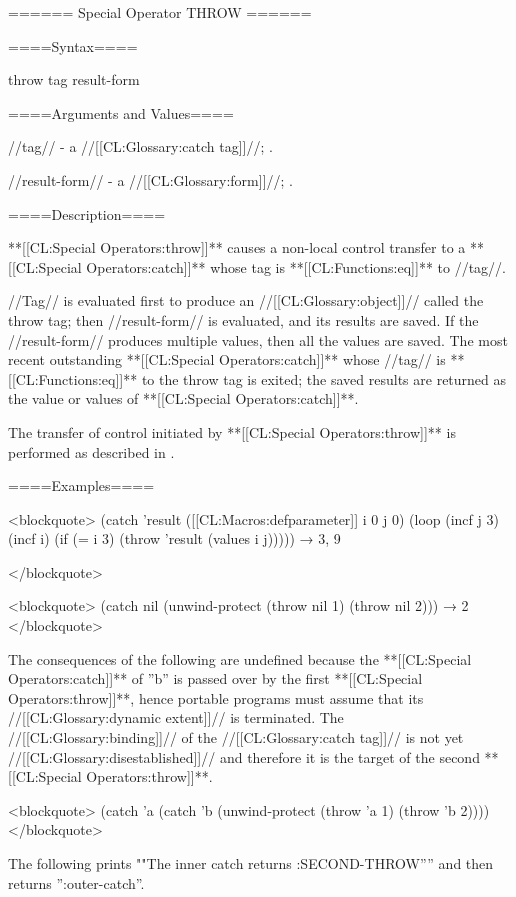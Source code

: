 ====== Special Operator THROW ======

====Syntax====

\DefspecNoReturn throw {tag result-form}

====Arguments and Values====

//tag// - a //[[CL:Glossary:catch tag]]//; \eval.

//result-form// - a //[[CL:Glossary:form]]//; \evalspecial.

====Description====

**[[CL:Special Operators:throw]]** causes a non-local control transfer to a **[[CL:Special Operators:catch]]** whose tag is **[[CL:Functions:eq]]** to //tag//.

//Tag// is evaluated first to produce an //[[CL:Glossary:object]]// called the throw tag; then //result-form// is evaluated, and its results are saved. If the //result-form// produces multiple values, then all the values are saved. The most recent outstanding **[[CL:Special Operators:catch]]** whose //tag// is **[[CL:Functions:eq]]** to the throw tag is exited; the saved results are returned as the value or values of **[[CL:Special Operators:catch]]**.

The transfer of control initiated by **[[CL:Special Operators:throw]]** is performed as described in \secref\TransferOfControl.

====Examples====

<blockquote> (catch 'result ([[CL:Macros:defparameter]] i 0 j 0) (loop (incf j 3) (incf i) (if (= i 3) (throw 'result (values i j))))) → 3, 9

</blockquote>

<blockquote> (catch nil (unwind-protect (throw nil 1) (throw nil 2))) → 2 </blockquote>

The consequences of the following are undefined because the **[[CL:Special Operators:catch]]** of ''b'' is passed over by the first **[[CL:Special Operators:throw]]**, hence portable programs must assume that its //[[CL:Glossary:dynamic extent]]// is terminated. The //[[CL:Glossary:binding]]// of the //[[CL:Glossary:catch tag]]// is not yet //[[CL:Glossary:disestablished]]// and therefore it is the target of the second **[[CL:Special Operators:throw]]**.

<blockquote> (catch 'a (catch 'b (unwind-protect (throw 'a 1) (throw 'b 2)))) </blockquote>

The following prints ""The inner catch returns :SECOND-THROW'''' and then returns '':outer-catch''.

